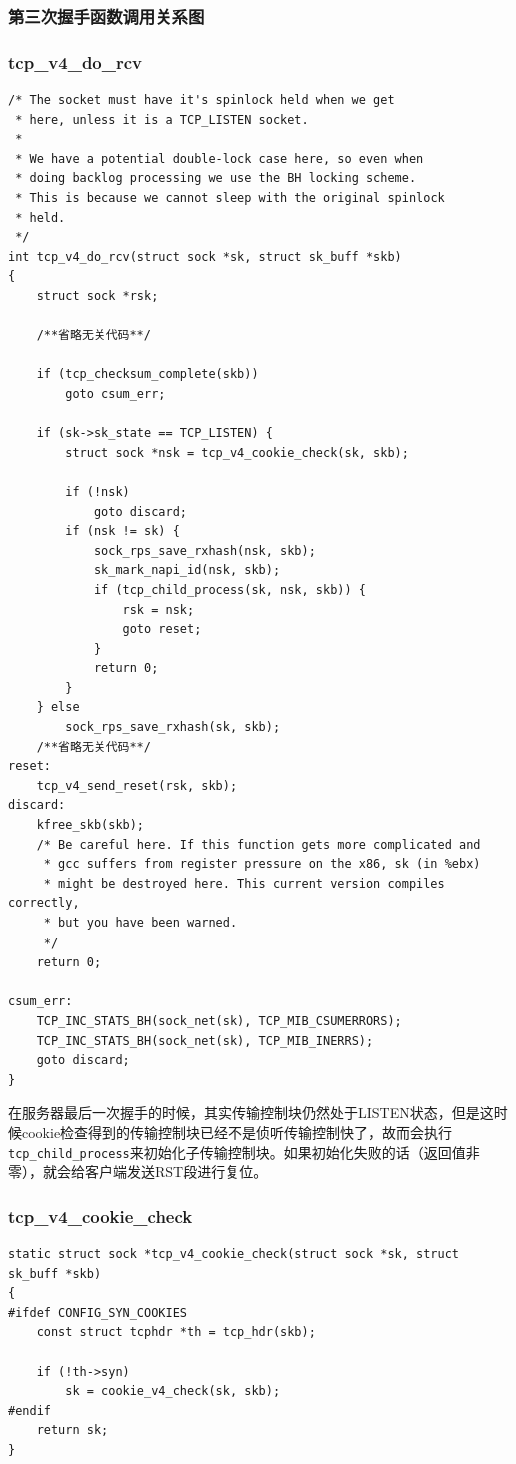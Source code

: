				\subsubsection{第三次握手函数调用关系图}
				\subsubsection{tcp\_v4\_do\_rcv}
\begin{verbatim}
/* The socket must have it's spinlock held when we get
 * here, unless it is a TCP_LISTEN socket.
 *
 * We have a potential double-lock case here, so even when
 * doing backlog processing we use the BH locking scheme.
 * This is because we cannot sleep with the original spinlock
 * held.
 */
int tcp_v4_do_rcv(struct sock *sk, struct sk_buff *skb)
{
	struct sock *rsk;

	/**省略无关代码**/

	if (tcp_checksum_complete(skb))
		goto csum_err;

	if (sk->sk_state == TCP_LISTEN) {
		struct sock *nsk = tcp_v4_cookie_check(sk, skb);

		if (!nsk)
			goto discard;
		if (nsk != sk) {
			sock_rps_save_rxhash(nsk, skb);
			sk_mark_napi_id(nsk, skb);
			if (tcp_child_process(sk, nsk, skb)) {
				rsk = nsk;
				goto reset;
			}
			return 0;
		}
	} else
		sock_rps_save_rxhash(sk, skb);
	/**省略无关代码**/
reset:
	tcp_v4_send_reset(rsk, skb);
discard:
	kfree_skb(skb);
	/* Be careful here. If this function gets more complicated and
	 * gcc suffers from register pressure on the x86, sk (in %ebx)
	 * might be destroyed here. This current version compiles correctly,
	 * but you have been warned.
	 */
	return 0;

csum_err:
	TCP_INC_STATS_BH(sock_net(sk), TCP_MIB_CSUMERRORS);
	TCP_INC_STATS_BH(sock_net(sk), TCP_MIB_INERRS);
	goto discard;
}
\end{verbatim}
					在服务器最后一次握手的时候，其实传输控制块仍然处于LISTEN状态，但是这时候cookie检查得到的传输控制块已经不是侦听传输控制快了，故而会执行\texttt{tcp_child_process}来初始化子传输控制块。如果初始化失败的话（返回值非零），就会给客户端发送RST段进行复位。

				\subsubsection{tcp\_v4\_cookie\_check}

\begin{verbatim}
static struct sock *tcp_v4_cookie_check(struct sock *sk, struct sk_buff *skb)
{
#ifdef CONFIG_SYN_COOKIES
    const struct tcphdr *th = tcp_hdr(skb);

    if (!th->syn)
        sk = cookie_v4_check(sk, skb);
#endif
    return sk;
}
\end{verbatim}

